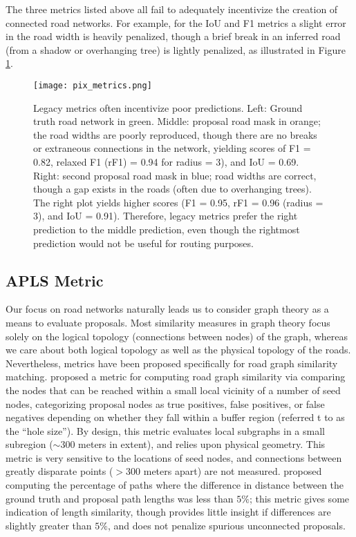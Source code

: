 \documentclass{article}
\begin{document}
The three metrics listed above all fail to adequately incentivize the creation of connected road networks. For example, for the IoU and F1 metrics a slight error in the road width is heavily penalized, though a brief break in an inferred road (from a shadow or overhanging tree) is lightly penalized, as illustrated in Figure \ref{fig:pix_metrics}.  


\begin{figure}
  \centering
     \texttt{[image: pix\_metrics.png]}
  \caption{Legacy metrics often incentivize poor predictions.  Left: Ground truth road network in green.  Middle: proposal road mask in orange; the road widths are poorly reproduced, though there are no breaks or extraneous connections in the network, yielding scores of F1 = 0.82, relaxed F1 (rF1) = 0.94 for radius = 3), and IoU = 0.69.  Right: second proposal road mask in blue; road widths are correct, though a gap exists in the roads (often due to overhanging trees).  The right plot yields higher scores (F1 = 0.95, rF1 = 0.96 (radius = 3), and IoU = 0.91).  Therefore, legacy metrics prefer the right prediction to the middle prediction, even though the rightmost prediction would not be useful for routing purposes.}
  \label{fig:pix_metrics}
\end{figure}

\subsection{APLS Metric}

Our focus on road networks naturally leads us to consider graph theory as a means to evaluate proposals. Most similarity measures in graph theory focus solely on the logical topology (connections between nodes) of the graph, whereas we care about both logical topology as well as the physical topology of the roads.  Nevertheless, metrics have been proposed specifically for road graph similarity matching.  \cite{topo_metric} proposed a metric for computing road graph similarity via comparing the nodes that can be reached within a small local vicinity of a number of seed nodes, categorizing proposal nodes as true positives, false positives, or false negatives depending on whether they fall within a buffer region (referred t to as the ``hole size''). By design, this metric evaluates local subgraphs in a small subregion ($\sim 300$ meters in extent), and relies upon physical geometry.  This metric is very sensitive to the locations of seed nodes, and connections between greatly disparate points ($>300$ meters apart) are not measured. 
\cite{5perc_metric} proposed computing the percentage of paths where the difference in distance between the ground truth and proposal path lengths was less than $5\%$; this metric gives some indication of length similarity, though provides little insight if differences are slightly greater than $5\%$, and does not penalize spurious unconnected proposals.
\end{document}
